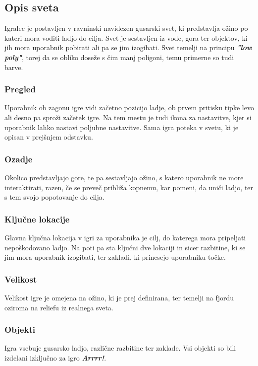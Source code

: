 \documentclass[a4paper]{article}
\begin{document}
\subsection{Opis sveta}
Igralec je postavljen v ravninski navidezen gusarski svet, ki predstavlja o\v zino po kateri mora voditi ladjo do cilja. Svet je sestavljen iz vode, gora ter objektov, ki jih mora uporabnik pobirati ali pa se jim izogibati. Svet temelji na principu \textbf{\textit{"low poly"}}, torej da se obliko dose\v ze s \v cim manj poligoni, temu primerne so tudi barve.

\subsubsection{Pregled}
Uporabnik ob zagonu igre vidi za\v cetno pozicijo ladje, ob prvem pritisku tipke levo ali desno pa spro\v zi za\v cetek igre. Na tem mestu je tudi ikona za nastavitve, kjer si uporabnik lahko nastavi poljubne nastavitve. Sama igra poteka v svetu, ki je opisan v prej\v snjem odstavku. 

\subsubsection{Ozadje}
Okolico predstavljajo gore, te pa sestavljajo o\v zino, s katero uporabnik ne more interaktirati, razen, \v ce se preve\v c pribli\v za kopnemu, kar pomeni, da uni\v ci ladjo, ter s tem svojo popotovanje do cilja.

\subsubsection{Ključne lokacije}
Glavna klju\v cna lokacija v igri za uporabnika je cilj, do katerega mora pripeljati nepo\v skodovano ladjo. Na poti pa sta klju\v cni dve lokaciji in sicer razbitine, ki se jim mora uporabnik izogibati, ter zakladi, ki prinesejo uporabniku to\v cke.

\subsubsection{Velikost}
Velikost igre je omejena na o\v zino, ki je prej definirana, ter temelji na fjordu oziroma na reliefu iz realnega sveta.

\subsubsection{Objekti}
Igra vsebuje gusarsko ladjo, razli\v cne razbitine ter zaklade. Vsi objekti so bili izdelani izklju\v cno za igro \textbf{\textit{Arrrr!}}.
\end{document}
